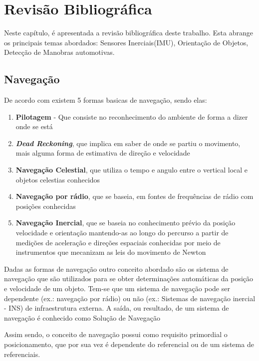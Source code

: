 \chapter{Revisão Bibliográfica}\label{RevisãoBibliográfica}

Neste capítulo, é apresentada a revisão bibliográfica deste trabalho. Esta abrange os principais temas abordados: Sensores Inerciais(IMU), Orientação de Objetos, Detecção de Manobras automotivas.

\section{Navegação}
De acordo com \citeauthor*{grewal2007global} existem 5 formas basicas de navegação, sendo elas:
\begin{enumerate}
    \item \textbf{Pilotagem} - Que consiste no reconhecimento do ambiente de forma a dizer onde se está
    \item \textbf{\textit{Dead Reckoning}}, que implica em saber de onde se partiu o movimento, mais alguma forma de estimativa de direção e velocidade
    \item \textbf{Navegação Celestial}, que utiliza o tempo e angulo entre o vertical local e objetos celestias conhecidos
    \item \textbf{Navegação por rádio}, que se baseia, em fontes de frequências de rádio com posições conhecidas
    \item \textbf{Navegação Inercial}, que se baseia no conhecimento prévio da posição velocidade e orientação mantendo-as ao longo do percurso a partir de medições de aceleração e direções espaciais conhecidas por meio de instrumentos que mecanizam as leis do movimento de Newton
\end{enumerate}{}

Dadas as formas de navegação outro conceito abordado são os sistema de navegação que são utilizados para se obter determinações automáticas da posição e velocidade de um objeto. Tem-se que um sistema de navegação pode ser dependente (ex.: navegação por rádio) ou não (ex.: Sistemas de navegação inercial - INS) de infraestrutura externa. A saída, ou resultado, de um sistema de navegação é conhecido como Solução de Navegação \cite{groves2008principles}

Assim sendo, o conceito de navegação possui como requisito primordial o posicionamento, que por sua vez é dependente do referencial ou de um sistema de referenciais. 

